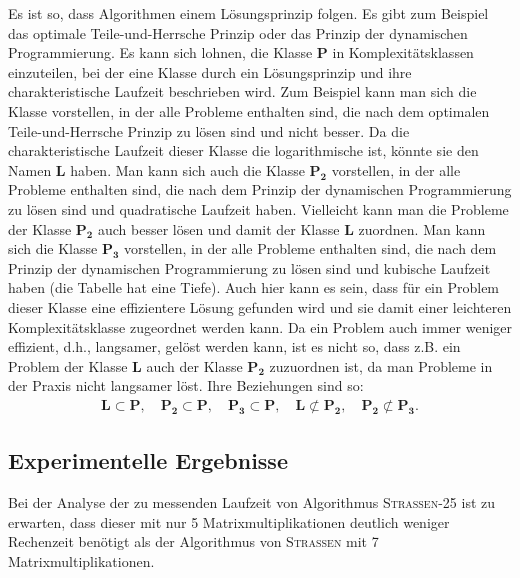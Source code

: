 \documentclass{scrartcl}
\begin{document}
Es ist so, dass Algorithmen einem Lösungsprinzip folgen. Es gibt zum Beispiel das optimale Teile-und-Herrsche Prinzip oder das Prinzip der dynamischen Programmierung. Es kann sich lohnen, die Klasse $\mathbf{P}$ in Komplexitätsklassen einzuteilen, bei der eine Klasse durch ein Lösungsprinzip und ihre charakteristische Laufzeit beschrieben wird. Zum Beispiel kann man sich die Klasse vorstellen, in der alle Probleme enthalten sind, die nach dem optimalen Teile-und-Herrsche Prinzip zu lösen sind und nicht besser. Da die charakteristische Laufzeit dieser Klasse die logarithmische ist, könnte sie den Namen $\mathbf{L}$ haben. Man kann sich auch die Klasse $\mathbf{P_2}$ vorstellen, in der alle Probleme enthalten sind, die nach dem Prinzip der dynamischen Programmierung zu lösen sind und quadratische Laufzeit haben. Vielleicht kann man die Probleme der Klasse $\mathbf{P_2}$ auch besser lösen und damit der Klasse $\mathbf{L}$ zuordnen. Man kann sich die Klasse $\mathbf{P_3}$ vorstellen, in der alle Probleme enthalten sind, die nach dem Prinzip der dynamischen Programmierung zu lösen sind und kubische Laufzeit haben (die Tabelle hat eine Tiefe). Auch hier kann es sein, dass für ein Problem dieser Klasse eine effizientere Lösung gefunden wird und sie damit einer leichteren Komplexitätsklasse zugeordnet werden kann. Da ein Problem auch immer weniger effizient, d.h., langsamer, gelöst werden kann, ist es nicht so, dass z.B. ein Problem der Klasse $\mathbf{L}$ auch der Klasse $\mathbf{P_2}$ zuzuordnen ist, da man Probleme in der Praxis nicht langsamer löst. Ihre Beziehungen sind so:
\begin{align*}
	\mathbf{L} \subset \mathbf{P}, \quad \mathbf{P_2} \subset \mathbf{P}, \quad \mathbf{P_3} \subset \mathbf{P}, \quad \mathbf{L} \not \subset \mathbf{P_2}, \quad \mathbf{P_2} \not \subset \mathbf{P_3}.
\end{align*}

\subsection{Experimentelle Ergebnisse}
Bei der Analyse der zu messenden Laufzeit von Algorithmus \textsc{Strassen-25} ist zu erwarten, dass dieser mit nur 5 Matrixmultiplikationen deutlich weniger Rechenzeit benötigt als der Algorithmus von \textsc{Strassen} mit 7 Matrixmultiplikationen.
\end{document}
